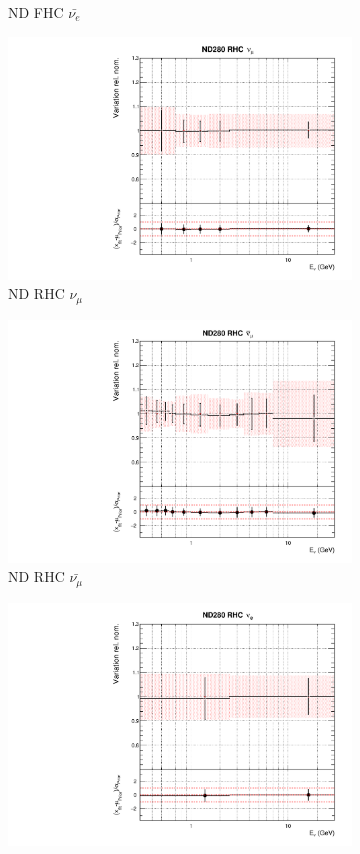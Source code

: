 \begin{figure}
\begin{subfigure}{0.24\textwidth}
  \caption{ND FHC $\bar{\nu_{e}}$}
\end{subfigure}
\begin{subfigure}{0.24\textwidth}
  \centering
  \includegraphics[width=0.95\linewidth]{figs/asmvflux4}
  \caption{ND RHC $\nu_{\mu}$}
\end{subfigure}
\begin{subfigure}{0.24\textwidth}
  \centering
  \includegraphics[width=0.95\linewidth]{figs/asmvflux5}
  \caption{ND RHC $\bar{\nu_{\mu}}$}
\end{subfigure}
\begin{subfigure}{0.24\textwidth}
  \centering
  \includegraphics[width=0.95\linewidth]{figs/asmvflux6}

\end{subfigure}
\end{figure}
